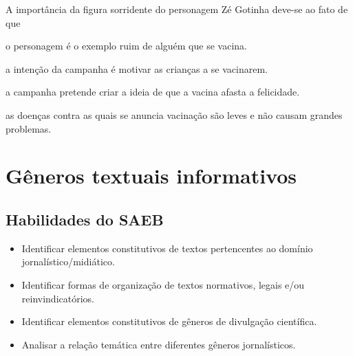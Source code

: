 A importância da figura sorridente do personagem Zé Gotinha deve-se ao
fato de que

\begin{escolha}
\item
  o personagem é o exemplo ruim de alguém que se vacina.
\item
  a intenção da campanha é motivar as crianças a se vacinarem.
\item
  a campanha pretende criar a ideia de que a vacina afasta a felicidade.
\item
  as doenças contra as quais se anuncia vacinação são leves e não causam grandes
  problemas.
\end{escolha}


\chapter{Gêneros textuais informativos}

\section*{Habilidades do SAEB} 

\begin{itemize}
\item Identificar elementos constitutivos de textos pertencentes ao domínio jornalístico/midiático.
\item Identificar formas de organização de textos normativos, legais e/ou reinvindicatórios.
\item Identificar elementos constitutivos de gêneros de divulgação científica.
\item Analisar a relação temática entre diferentes gêneros jornalísticos.
\end{itemize}

